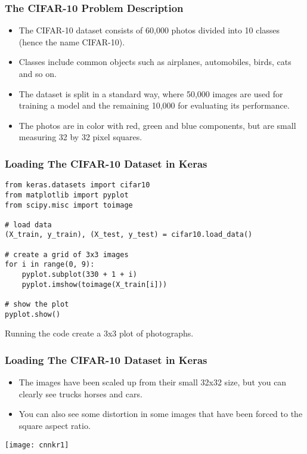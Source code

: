 \begin{frame}[fragile] \frametitle{The CIFAR-10 Problem Description}

\begin{itemize}
\item The CIFAR-10 dataset consists of 60,000 photos divided into 10 classes (hence the name CIFAR-10). 
\item Classes include common objects such as airplanes, automobiles, birds, cats and so on. 
\item The dataset is split in a standard way, where 50,000 images are used for training a model and the remaining 10,000 for evaluating its performance.
\item The photos are in color with red, green and blue components, but are small measuring 32 by 32 pixel squares.
\end{itemize}
\end{frame}


\begin{frame}[fragile] \frametitle{Loading The CIFAR-10 Dataset in Keras}

\begin{lstlisting}
from keras.datasets import cifar10
from matplotlib import pyplot
from scipy.misc import toimage

# load data
(X_train, y_train), (X_test, y_test) = cifar10.load_data()

# create a grid of 3x3 images
for i in range(0, 9):
    pyplot.subplot(330 + 1 + i)
    pyplot.imshow(toimage(X_train[i]))
    
# show the plot
pyplot.show()
\end{lstlisting}
Running the code create a 3x3 plot of photographs.
\end{frame}


\begin{frame}[fragile] \frametitle{Loading The CIFAR-10 Dataset in Keras}
\begin{itemize}
\item The images have been scaled up from their small 32x32 size, but you can clearly see trucks horses and cars.
\item You can also see some distortion in some images that have been forced to the square aspect ratio.
\end{itemize}
\begin{center}
\texttt{[image: cnnkr1]}
\end{center}
\end{frame}



